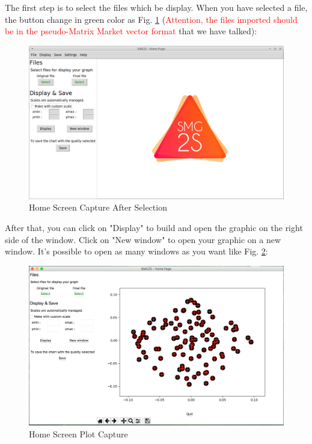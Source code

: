 \documentclass[a4paper, 10 pt]{report}
\begin{document}
The first step is to select the files which be display. When you have selected a file, the button change in green color as Fig. \ref{fig:Home Screen Capture After selection} (\textcolor{red}{Attention, the files imported should be in the pseudo-Matrix Market vector format} that we have talked):

\begin{figure}[htbp]
			\label{fig:Home Screen Capture After selection}
	\caption{Home Screen Capture After Selection}
		\centering
	\includegraphics[width=13cm]{home_ready.png}
\end{figure}

After that, you can click on "Display" to build and open the graphic on the right side of the window. Click on "New window" to open your graphic on a new window. It's possible to open as many windows as you want like Fig. \ref{fig:Home Screen Plot Capture}:

\begin{figure}[htbp]
				\label{fig:Home Screen Plot Capture}
	\caption{Home Screen Plot Capture}
		\centering
	\includegraphics[width=12cm]{home_screen.png}
\end{figure}
\end{document}
